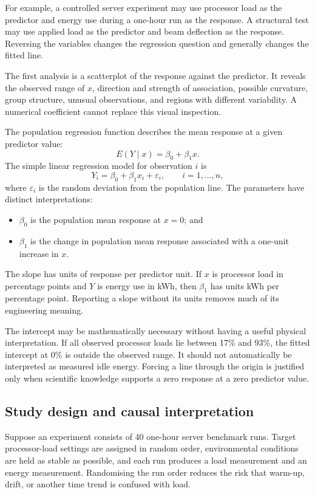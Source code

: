 For example, a controlled server experiment may use processor load as the predictor and energy use during a one-hour run as the response. A structural test may use applied load as the predictor and beam deflection as the response. Reversing the variables changes the regression question and generally changes the fitted line.

The first analysis is a scatterplot of the response against the predictor. It reveals the observed range of $x$, direction and strength of association, possible curvature, group structure, unusual observations, and regions with different variability. A numerical coefficient cannot replace this visual inspection.

The population regression function describes the mean response at a given predictor value:
\[
E(Y\mid x)=\beta_0+\beta_1x.
\]
The simple linear regression model for observation $i$ is
\[
Y_i=\beta_0+\beta_1x_i+\varepsilon_i,
\qquad i=1,\ldots,n,
\]
where $\varepsilon_i$ is the random deviation from the population line. The parameters have distinct interpretations:

\begin{itemize}
  \item $\beta_0$ is the population mean response at $x=0$; and
  \item $\beta_1$ is the change in population mean response associated with a one-unit increase in $x$.
\end{itemize}

The slope has units of response per predictor unit. If $x$ is processor load in percentage points and $Y$ is energy use in kWh, then $\beta_1$ has units kWh per percentage point. Reporting a slope without its units removes much of its engineering meaning.

The intercept may be mathematically necessary without having a useful physical interpretation. If all observed processor loads lie between 17\% and 93\%, the fitted intercept at 0\% is outside the observed range. It should not automatically be interpreted as measured idle energy. Forcing a line through the origin is justified only when scientific knowledge supports a zero response at a zero predictor value.

\subsection{Study design and causal interpretation}

Suppose an experiment consists of 40 one-hour server benchmark runs. Target processor-load settings are assigned in random order, environmental conditions are held as stable as possible, and each run produces a load measurement and an energy measurement. Randomising the run order reduces the risk that warm-up, drift, or another time trend is confused with load.

